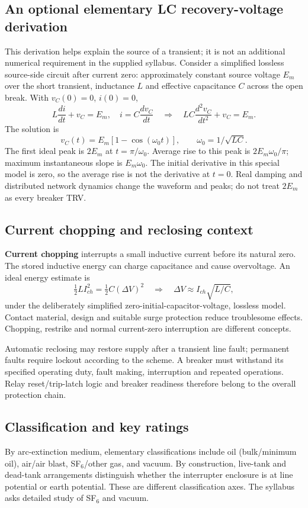 \documentclass[11pt,a4paper]{article}
\begin{document}
\subsection{An optional elementary LC recovery-voltage derivation}
This derivation helps explain the source of a transient; it is not an additional numerical requirement in the supplied syllabus. Consider a simplified lossless source-side circuit after current zero: approximately constant source voltage $E_m$ over the short transient, inductance $L$ and effective capacitance $C$ across the open break. With $v_C(0)=0$, $i(0)=0$,
\[
 L\frac{di}{dt}+v_C=E_m,\quad i=C\frac{dv_C}{dt}
 \quad\Rightarrow\quad LC\frac{d^2v_C}{dt^2}+v_C=E_m.
\]
The solution is
\[
 v_C(t)=E_m[1-\cos(\omega_0t)],\qquad \omega_0=1/\sqrt{LC}.
\]
The first ideal peak is $2E_m$ at $t=\pi/\omega_0$. Average rise to this peak is $2E_m\omega_0/\pi$; maximum instantaneous slope is $E_m\omega_0$. The initial derivative in this special model is zero, so the average rise is not the derivative at $t=0$. Real damping and distributed network dynamics change the waveform and peaks; do not treat $2E_m$ as every breaker TRV.

\subsection{Current chopping and reclosing context}
\textbf{Current chopping} interrupts a small inductive current before its natural zero. The stored inductive energy can charge capacitance and cause overvoltage. An ideal energy estimate is
\[
 \tfrac12LI_{ch}^2=\tfrac12C(\Delta V)^2
 \quad\Rightarrow\quad \Delta V\approx I_{ch}\sqrt{L/C},
\]
under the deliberately simplified zero-initial-capacitor-voltage, lossless model. Contact material, design and suitable surge protection reduce troublesome effects. Chopping, restrike and normal current-zero interruption are different concepts.

Automatic reclosing may restore supply after a transient line fault; permanent faults require lockout according to the scheme. A breaker must withstand its specified operating duty, fault making, interruption and repeated operations. Relay reset/trip-latch logic and breaker readiness therefore belong to the overall protection chain.

\subsection{Classification and key ratings}
By arc-extinction medium, elementary classifications include oil (bulk/minimum oil), air/air blast, SF$_6$/other gas, and vacuum. By construction, live-tank and dead-tank arrangements distinguish whether the interrupter enclosure is at line potential or earth potential. These are different classification axes. The syllabus asks detailed study of SF$_6$ and vacuum.
\end{document}

